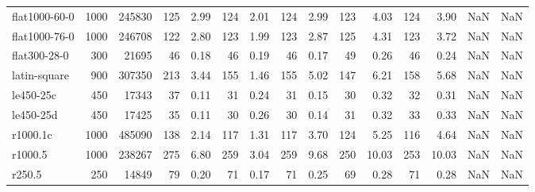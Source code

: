 \begin{table*}
\begin{adjustbox}{width=\textwidth}
\begin{minipage}[b]{\textwidth}
\begin{tabular}{@{} lrrrrrrrrrrrrrr @{}}
flat1000-60-0 & 1000 & 245830 & 125 & 2.99 & 124 & 2.01 & 124 & 2.99 & 123 & 4.03 & 124 & 3.90 & NaN & NaN \\
flat1000-76-0 & 1000 & 246708 & 122 & 2.80 & 123 & 1.99 & 123 & 2.87 & 125 & 4.31 & 123 & 3.72 & NaN & NaN \\
flat300-28-0 & 300 & 21695 & 46 & 0.18 & 46 & 0.19 & 46 & 0.17 & 49 & 0.26 & 46 & 0.24 & NaN & NaN \\
latin-square & 900 & 307350 & 213 & 3.44 & 155 & 1.46 & 155 & 5.02 & 147 & 6.21 & 158 & 5.68 & NaN & NaN \\
le450-25c & 450 & 17343 & 37 & 0.11 & 31 & 0.24 & 31 & 0.15 & 30 & 0.32 & 32 & 0.31 & NaN & NaN \\
le450-25d & 450 & 17425 & 35 & 0.11 & 30 & 0.26 & 30 & 0.14 & 31 & 0.32 & 33 & 0.33 & NaN & NaN \\
r1000.1c & 1000 & 485090 & 138 & 2.14 & 117 & 1.31 & 117 & 3.70 & 124 & 5.25 & 116 & 4.64 & NaN & NaN \\
r1000.5 & 1000 & 238267 & 275 & 6.80 & 259 & 3.04 & 259 & 9.68 & 250 & 10.03 & 253 & 10.03 & NaN & NaN \\
r250.5 & 250 & 14849 & 79 & 0.20 & 71 & 0.17 & 71 & 0.25 & 69 & 0.28 & 71 & 0.28 & NaN & NaN \\
\bottomrule
\end{tabular}
\end{minipage}
\end{adjustbox}
\end{table*}